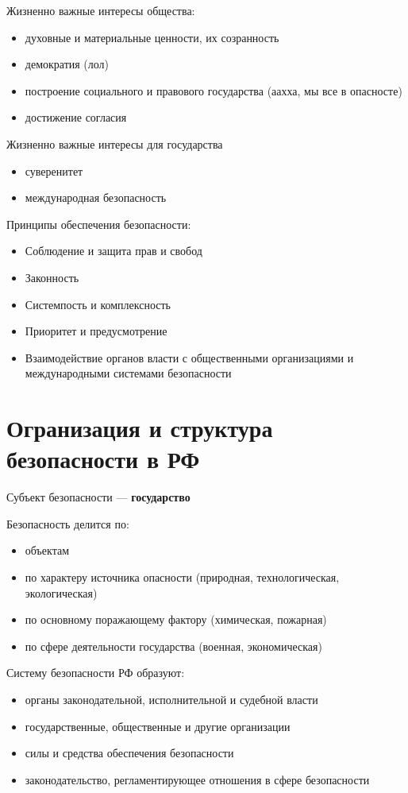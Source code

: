 \textsl{}\documentclass[oneside,final,14pt]{extreport}
\begin{document}
Жизненно важные интересы общества:
\begin{itemize}
	\item духовные и материальные ценности, их созранность
	\item демократия (лол)
	\item построение социального и правового государства (аахха, мы все в опасносте)
	\item достижение согласия
\end{itemize}

Жизненно важные интересы для государства
\begin{itemize}
	\item суверенитет
	\item международная безопасность
\end{itemize}

Принципы обеспечения безопасности:
\begin{itemize}
	\item Соблюдение и защита прав и свобод
	\item Законность
	\item Системпость и комплексность
	\item Приоритет и предусмотрение
	\item Взаимодействие органов власти с общественными организациями и международными системами безопасности
\end{itemize}

\section*{Огранизация и структура безопасности в РФ}
Субъект безопасности --- \textbf{государство}

Безопасность делится по:
\begin{itemize}
	\item объектам
	\item по характеру источника опасности (природная, технологическая, экологическая)
	\item по основному поражающему фактору (химическая, пожарная)
	\item по сфере деятельности государства (военная, экономическая)
\end{itemize}

Систему безопасности РФ образуют:
\begin{itemize}
	\item органы законодательной, исполнительной и судебной власти
	\item государственные, общественные и другие организации
	\item силы и средства обеспечения безопасности
	\item законодательство, регламентирующее отношения в сфере безопасности
\end{itemize}
\end{document}
